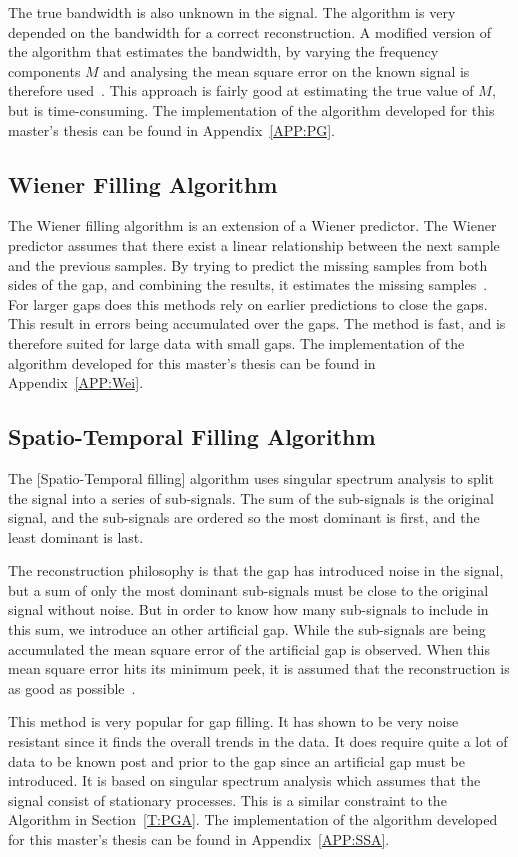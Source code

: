 The true bandwidth is also unknown in the signal. The  algorithm is very depended on the bandwidth for a correct reconstruction. A modified version of the algorithm that estimates the bandwidth, by varying the frequency components $M$ and analysing the mean square error on the known signal is therefore used~\cite{RefWorks:13}. This approach is fairly good at estimating the true value of $M$, but is time-consuming. The implementation of the algorithm developed for this master's thesis can be found in Appendix~\ref{APP:PG}.

\subsection{Wiener Filling Algorithm}
The Wiener filling algorithm is an extension of a Wiener predictor. The Wiener predictor assumes that there exist a linear relationship between the next sample and the previous samples. By trying to predict the missing samples from both sides of the gap, and combining the results, it estimates the missing samples~\citep{RefWorks:14}. For larger gaps does this methods rely on earlier predictions to close the gaps. This result in errors being accumulated over the gaps. The method is fast, and is therefore suited for large data with small gaps. The implementation of the algorithm developed for this master's thesis can be found in Appendix~\ref{APP:Wei}.

\subsection{Spatio-Temporal Filling Algorithm}
The [Spatio-Temporal filling] algorithm uses singular spectrum analysis to split the signal into a series of sub-signals. The sum of the sub-signals is the original signal, and the sub-signals are ordered so the most dominant is first, and the least dominant is last. 

The reconstruction philosophy is that the gap has introduced noise in the signal, but a sum of only the most dominant sub-signals must be close to the original signal without noise. But in order to know how many sub-signals to include in this sum, we introduce an other artificial gap. While the sub-signals are being accumulated the mean square error of the artificial gap is observed. When this mean square error hits its minimum peek, it is assumed that the reconstruction is as good as possible~\cite{RefWorks:15}.

This method is very popular for gap filling. It has shown to be very noise resistant since it finds the overall trends in the data. It does require quite a lot of data to be known post and prior to the gap since an artificial gap must be introduced. It is based on singular spectrum analysis which assumes that the signal consist of stationary processes. This is a similar constraint to the  Algorithm in Section~\ref{T:PGA}. The implementation of the algorithm developed for this master's thesis can be found in Appendix~\ref{APP:SSA}.

